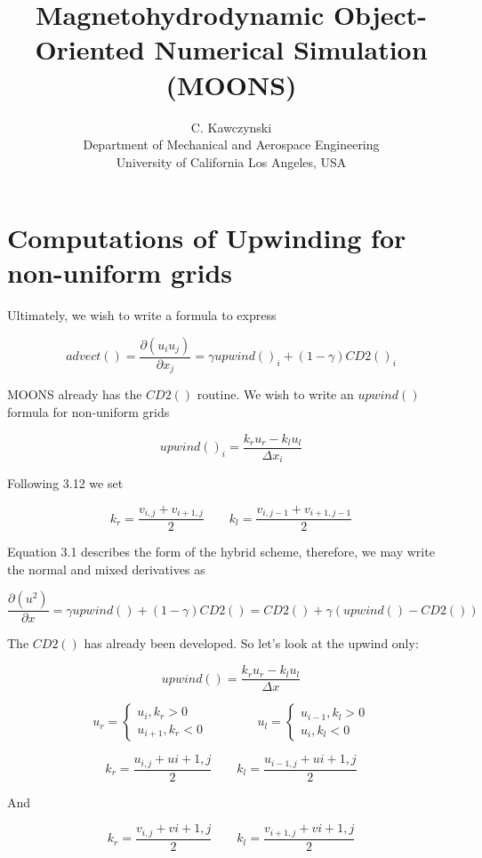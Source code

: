 \documentclass[11pt]{article}
\begin{document}
\doublespacing
\title{Magnetohydrodynamic Object-Oriented Numerical Simulation (MOONS)}
\author{C. Kawczynski \\
Department of Mechanical and Aerospace Engineering \\
University of California Los Angeles, USA\\
}
\maketitle

\section{Computations of Upwinding for non-uniform grids}

Ultimately, we wish to write a formula to express

\begin{equation}
	advect() = \frac{\partial(u_i u_j)}{\partial x_j}
	=
	\gamma upwind()_i
	+
	(1-\gamma) CD2()_i
\end{equation}

MOONS already has the $CD2()$ routine. We wish to write an $upwind()$ formula for non-uniform grids

\begin{equation}
	upwind()_i = \frac{k_r u_r - k_l u_l}{\Delta x_i}
\end{equation}

Following 3.12 we set

\begin{equation}
	k_r = \frac{v_{i,j}+v_{i+1,j}}{2} \qquad
	k_l = \frac{v_{i,j-1}+v_{i+1,j-1}}{2}
\end{equation}

Equation 3.1 describes the form of the hybrid scheme, therefore, we may write the normal and mixed derivatives as

\begin{equation}
	\frac{\partial(u^2)}{\partial x} = \gamma upwind() + (1-\gamma) CD2()
	=
	CD2() + \gamma (upwind()-CD2())
\end{equation}

The $CD2()$ has already been developed. So let's look at the upwind only:

\begin{equation}
	upwind() = \frac{k_r u_r - k_l u_l}{\Delta x}
\end{equation}

\begin{equation}
	u_r =
	\begin{cases}
	u_i , k_r>0 \\
	u_{i+1} , k_r <0
	\end{cases}
	\qquad
	\qquad
	u_l =
	\begin{cases}
	u_{i-1} , k_l>0 \\
	u_{i} , k_l <0
	\end{cases}
\end{equation}

\begin{equation}
	k_r = \frac{u_{i,j}+u{i+1,j}}{2}
	\qquad
	k_l = \frac{u_{i-1,j}+u{i+1,j}}{2}
\end{equation}

And

\begin{equation}
	k_r = \frac{v_{i,j}+v{i+1,j}}{2}
	\qquad
	k_l = \frac{v_{i+1,j}+v{i+1,j}}{2}
\end{equation}
\end{document}
